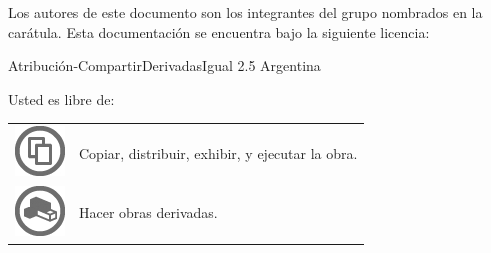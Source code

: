 \thispagestyle{empty}

\noindent\scriptsize Los autores de este documento son los integrantes del
grupo nombrados en la carátula. Esta documentación se encuentra bajo la
siguiente licencia:
\footnotesize

\begin{center}
\LARGE{Atribución-CompartirDerivadasIgual 2.5}\linebreak
\LARGE{Argentina}
\end{center}

\noindent Usted es libre de:\newline
\begin{tabular}[t]{rl}
\multirow{5}{*}{\includegraphics{licencia/share.jpg}} &
\multirow{5}{*}{\parbox{300pt}{Copiar, distribuir, exhibir, y ejecutar la
obra.}} \\ \\ \\ \\ \\
\multirow{5}{*}{\includegraphics{licencia/remix.jpg}} &
\multirow{5}{*}{\parbox{300pt}{Hacer obras derivadas.}} \\ \\ \\ \\
\end{tabular}\newline\newline

